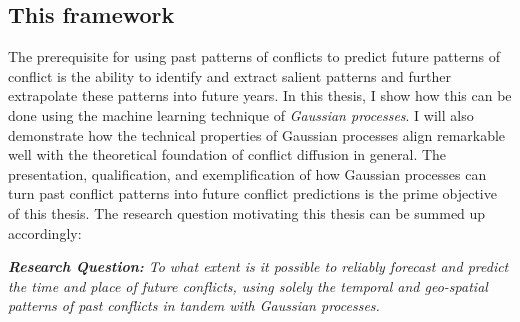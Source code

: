 \documentclass[a4paper]{article}
\begin{document}
\subsection{This framework}

The prerequisite for using past patterns of conflicts to predict future patterns of conflict is the ability to identify and extract salient patterns and further extrapolate these patterns into future years. In this thesis, I show how this can be done using the machine learning technique of \emph{Gaussian processes}. I will also demonstrate how the technical properties of Gaussian processes align remarkable well with the theoretical foundation of conflict diffusion in general.  The presentation, qualification, and exemplification of how Gaussian processes can turn past conflict patterns into future conflict predictions is the prime objective of this thesis. The research question motivating this thesis can be summed up accordingly:\par






\begin{displayquote}

\emph{\textbf{Research Question:} To what extent is it possible to reliably forecast and predict the time and place of future conflicts, using solely the temporal and geo-spatial patterns of past conflicts in tandem with Gaussian processes.}\par

\end{displayquote}

\end{document}
